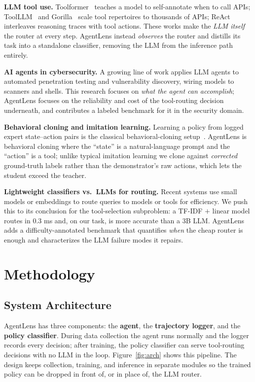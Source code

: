 \documentclass[conference]{IEEEtran}
\begin{document}
\textbf{LLM tool use.} Toolformer~\cite{toolformer} teaches a model to
self-annotate when to call APIs; ToolLLM~\cite{toolllm} and
Gorilla~\cite{gorilla} scale tool repertoires to thousands of APIs;
ReAct~\cite{react} interleaves reasoning traces with tool actions. These works
make the \emph{LLM itself} the router at every step. AgentLens instead
\emph{observes} the router and distills its task into a standalone classifier,
removing the LLM from the inference path entirely.

\textbf{AI agents in cybersecurity.} A growing line of work applies LLM agents
to automated penetration testing and vulnerability discovery, wiring models to
scanners and shells. This research focuses on \emph{what the agent can
accomplish}; AgentLens focuses on the reliability and cost of the tool-routing
decision underneath, and contributes a labeled benchmark for it in the security
domain.

\textbf{Behavioral cloning and imitation learning.} Learning a policy from
logged expert state--action pairs is the classical behavioral-cloning
setup~\cite{pomerleau1991}.
AgentLens is behavioral cloning where the ``state'' is a natural-language prompt
and the ``action'' is a tool; unlike typical imitation learning we clone against
\emph{corrected} ground-truth labels rather than the demonstrator's raw actions,
which lets the student exceed the teacher.

\textbf{Lightweight classifiers vs.\ LLMs for routing.} Recent systems use small
models or embeddings to route queries to models or tools for efficiency. We push
this to its conclusion for the tool-selection subproblem: a TF-IDF $+$ linear
model routes in 0.3 ms and, on our task, is more accurate than a 3B LLM.
AgentLens adds a difficulty-annotated benchmark that quantifies \emph{when} the
cheap router is enough and characterizes the LLM failure modes it repairs.

\section{Methodology}

\subsection{System Architecture}

AgentLens has three components: the \textbf{agent}, the \textbf{trajectory
logger}, and the \textbf{policy classifier}. During data collection the agent
runs normally and the logger records every decision; after training, the policy
classifier can serve tool-routing decisions with no LLM in the loop.
Figure~\ref{fig:arch} shows this pipeline. The design keeps collection,
training, and inference in separate modules so the trained policy can be dropped
in front of, or in place of, the LLM router.
\end{document}
